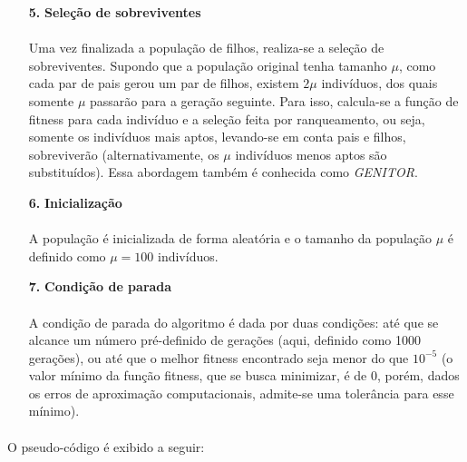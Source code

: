 \documentclass{report}
\begin{document}
\begin{itemize}
	\item[\textbf{5.}] \textbf{Seleção de sobreviventes}
	
	\paragraph{} Uma vez finalizada a população de filhos, realiza-se a seleção de sobreviventes. Supondo que a população original tenha tamanho $\mu$, como cada par de pais gerou um par de filhos, existem $2\mu$ indivíduos, dos quais somente $\mu$ passarão para a geração seguinte. Para isso, calcula-se a função de fitness para cada indivíduo e a seleção feita por ranqueamento, ou seja, somente os indivíduos mais aptos, levando-se em conta pais e filhos, sobreviverão (alternativamente, os $\mu$ indivíduos menos aptos são substituídos). Essa abordagem também é conhecida como \textit{GENITOR}.\\
	
	\item[\textbf{6.}] \textbf{Inicialização}
	
	\paragraph{} A população é inicializada de forma aleatória e o tamanho da população $\mu$ é definido como $\mu = 100$ indivíduos.\\
	
	\item[\textbf{7.}] \textbf{Condição de parada}
	
	\paragraph{} A condição de parada do algoritmo é dada por duas condições: até que se alcance um número pré-definido de gerações (aqui, definido como 1000 gerações), ou até que o melhor fitness encontrado seja menor do que $10^{-5}$ (o valor mínimo da função fitness, que se busca minimizar, é de 0, porém, dados os erros de aproximação computacionais, admite-se uma tolerância para esse mínimo).\\
\end{itemize}

\paragraph{} O pseudo-código é exibido a seguir:\\
\end{document}
